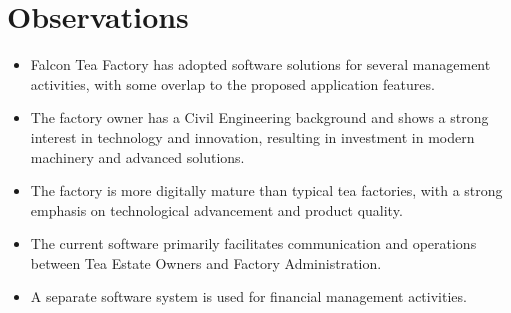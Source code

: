 \section*{Observations}
\begin{itemize}
  \item Falcon Tea Factory has adopted software solutions for several management activities, with some overlap to the proposed application features.
  \item The factory owner has a Civil Engineering background and shows a strong interest in technology and innovation, resulting in investment in modern machinery and advanced solutions.
  \item The factory is more digitally mature than typical tea factories, with a strong emphasis on technological advancement and product quality.
  \item The current software primarily facilitates communication and operations between Tea Estate Owners and Factory Administration.
  \item A separate software system is used for financial management activities.
\end{itemize}
